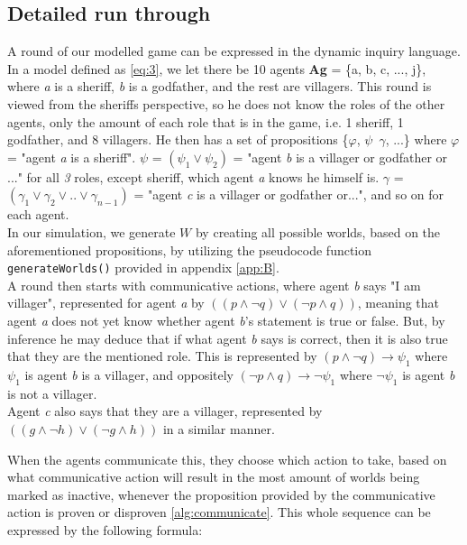 \subsection{Detailed run through}\label{sec:ARoundOfTheGame}
A round of our modelled game can be expressed in the dynamic inquiry language.
In a model defined as \cref{eq:3}, we let there be 10 agents \textbf{Ag} = \{a,
b, c, ..., j\}, where \textit{a} is a sheriff, \textit{b} is a godfather, and
the rest are villagers. This round is viewed from the sheriffs perspective, so
he does not know the roles of the other agents, only the amount of each role
that is in the game, i.e. 1 sheriff, 1 godfather, and 8 villagers. He then has
a set of propositions \{$\varphi$, $\psi$\, $\gamma$, ...\} where $\varphi$ =
"agent \textit{a} is a sheriff". $\psi$ = $(\psi_1 \lor \psi_2)$ = "agent
\textit{b} is a villager or godfather or ..." for all \textit{3} roles, except
sheriff, which agent \textit{a} knows he himself is. $\gamma$ = $(\gamma_1 \lor
	\gamma_2 \lor .. \lor \gamma_{n-1}) $ = "agent \textit{c} is a villager or
godfather or...", and so on for each agent. \\ In our simulation, we generate
$W$ by creating all possible worlds, based on the aforementioned propositions,
by utilizing the pseudocode function
\lstinline{generateWorlds()} provided in appendix \ref{app:B}. \\ A round then
starts with communicative actions, where agent \textit{b} says "I am villager",
represented for agent \textit{a} by $((p \land \neg q) \lor (\neg p \land q))$,
 meaning that agent \textit{a} does not yet know whether
agent \textit{b}'s statement is true or false. But, by inference he may deduce
that if what agent \textit{b} says is correct, then it is also true that they
are the mentioned role. This is represented by $(p \land \neg q) \rightarrow
	\psi_1$ where $\psi_1$ is agent \textit{b} is a villager, and oppositely $(\neg
	p \land q) \rightarrow \neg \psi_1$ where $\neg \psi_1$ is agent \textit{b} is
not a villager. \\ Agent \textit{c} also says that they are a villager,
represented by $((g \land \neg h) \lor (\neg g \land h))$ in a similar manner.

When the agents communicate this, they choose which action to take, based on
what communicative action will result in the most amount of worlds being marked
as inactive, whenever the proposition provided by the communicative action is
proven or disproven \ref{alg:communicate}. This whole sequence can be expressed
by the following formula:

